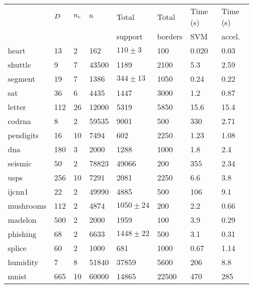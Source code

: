 \begin{tabular}{|l|lllllll|}
	\hline
	& $D$ & $n_c$ & $n$ & Total & Total & Time (s) & Time (s)\\
	& & & & support & borders & SVM & accel. \\\hline
	heart & 13 & 2 & 162 & $110\pm3$ & 100 & 0.020 & 0.03\\
	shuttle & 9 & 7 & 43500 & 1189 & 2100 & 5.3 & 2.59\\
	segment & 19 & 7 & 1386 & $344\pm13$ & 1050 & 0.24 & 0.22 \\
	sat & 36 & 6 & 4435 & 1447 & 3000 & 1.2 & 0.87 \\
	letter & 112 & 26 & 12000 & 5319 & 5850 & 15.6 & 15.4 \\ 
	codrna & 8 & 2 & 59535 & 9001 & 500 & 330 & 2.71 \\
	pendigits & 16 & 10 & 7494 & 602 & 2250 & 1.23 & 1.08 \\
	dna & 180 & 3 & 2000 & 1288 & 1000 & 1.8 & 2.4 \\
	seismic & 50 & 2 & 78823 & 49066 & 200 & 355 & 2.34 \\
	usps & 256 & 10 & 7291 & 2081 & 2250 & 6.6 & 3.8 \\
	ijcnn1 & 22 & 2 & 49990 & 4885 & 500 & 106 & 9.1 \\
	mushrooms & 112 & 2 & 4874 & $1050\pm24$ & 200 & 2.2 & 0.66 \\
	madelon & 500 & 2 & 2000 & 1959 & 100 & 3.9 & 0.29 \\
	phishing & 68 & 2 & 6633 & $1448\pm22$ & 500 & 3.1 & 0.31 \\
	splice & 60 & 2 & 1000 & 681 & 1000 & 0.67 & 1.14 \\
	humidity & 7 & 8 & 51840 & 37859 & 5600 & 206 & 8.8 \\
	mnist & 665 & 10 & 60000 & 14865 & 22500 & 470 & 285 \\\hline
\end{tabular}

